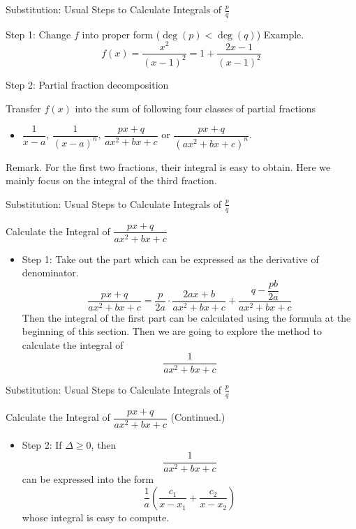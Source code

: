 \documentclass[aspectratio=169, UTF8]{ctexbeamer}
\begin{document}
    \begin{frame}[t]{Substitution: Usual Steps to Calculate Integrals of $\frac{p}{q}$}
        \begin{block}{Step 1: Change $f$ into proper form ($\deg(p) < \deg(q)$)}
            \textcolor{yy}{Example.} $$f(x)=\dfrac{x^2}{(x-1)^2}=1+\dfrac{2x-1}{(x-1)^2}$$
        \end{block}
        \begin{block}{Step 2: Partial fraction decomposition}
            \par Transfer $f(x)$ into the sum of following four classes of partial fractions
            \begin{itemize}
                \item $\dfrac{1}{x-a}$, $\dfrac{1}{(x-a)^{n}}$, $\dfrac{px+q}{ax^{2}+bx+c}$ or $\dfrac{px+q}{(ax^{2}+bx+c)^n}$.
            \end{itemize}
        \end{block}
        \par \textcolor{yy}{Remark.} For the first two fractions, their integral is easy to obtain. Here we mainly focus on the integral of the third fraction.
    \end{frame}

    \begin{frame}[t]{Substitution: Usual Steps to Calculate Integrals of $\frac{p}{q}$}
        \begin{block}{Calculate the Integral of $\dfrac{px+q}{ax^{2}+bx+c}$}
            \begin{itemize}
                \item Step 1: Take out the part which can be expressed as the derivative of denominator.\\
                $$
                \dfrac{px+q}{ax^2+bx+c}=\dfrac{p}{2a}\cdot\dfrac{2ax+b}{ax^2+bx+c}+\dfrac{q-\dfrac{pb}{2a}}{ax^2+bx+c}
                $$ \pause 
                Then the integral of the first part can be calculated using the formula at the beginning of this section. \pause Then we are going to explore the method to calculate the integral of $$\dfrac{1}{ax^{2}+bx+c}$$
            \end{itemize}
        \end{block}
    \end{frame}

    \begin{frame}[t]{Substitution: Usual Steps to Calculate Integrals of $\frac{p}{q}$}
        \begin{block}{Calculate the Integral of $\dfrac{px+q}{ax^{2}+bx+c}$ (Continued.)}
            \begin{itemize}
                \item Step 2: If $\Delta\geq 0$, then $$\dfrac{1}{ax^{2}+bx+c}$$ can be expressed into the form $$\dfrac{1}{a}(\dfrac{c_1}{x-x_1}+\dfrac{c_2}{x-x_2})$$ whose integral is easy to compute.
            \end{itemize}
        \end{block}
    \end{frame}
\end{document}
